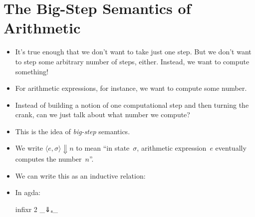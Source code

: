 \documentclass{lecturenotes}
\begin{document}
\section{The Big-Step Semantics of Arithmetic}
\label{sec:big-step-semantics}

\begin{itemize}
\item It's true enough that we don't want to take just one step.
  But we don't want to step some arbitrary number of steps, either.
  Instead, we want to compute something!
\item For arithmetic expressions, for instance, we want to compute some number.
\item Instead of building a notion of one computational step and then turning the crank, can we just talk about what number we compute?
\item This is the idea of \emph{big-step} semantics.
\item We write $\langle e, \sigma \rangle \Downarrow n$ to mean ``in state~$\sigma$, arithmetic expression~$e$ eventually computes the number~$n$''.
\item We can write this as an inductive relation:
\item In agda:
\begin{code}
infixr 2 _⇓ₐ_


\end{code}
\end{itemize}
\end{document}

